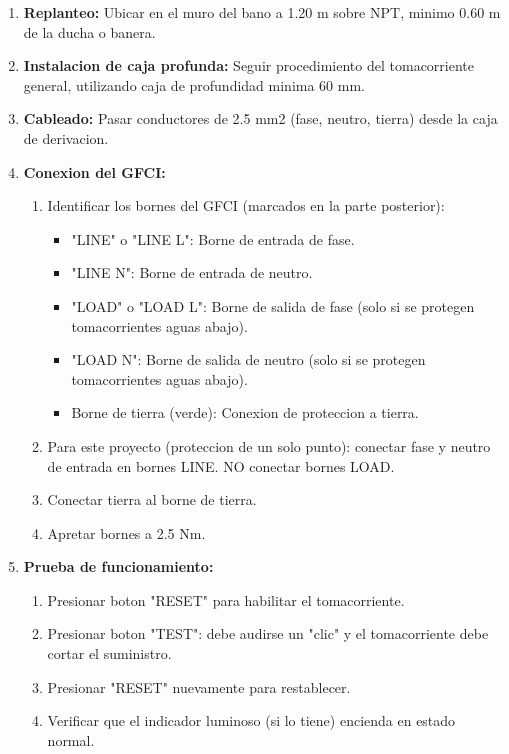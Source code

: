\begin{enumerate}
  \item \textbf{Replanteo:} Ubicar en el muro del bano a 1.20 m sobre NPT, minimo 0.60 m de la ducha o banera.
  \item \textbf{Instalacion de caja profunda:} Seguir procedimiento del tomacorriente general, utilizando caja de profundidad minima 60 mm.
  \item \textbf{Cableado:} Pasar conductores de 2.5 mm2 (fase, neutro, tierra) desde la caja de derivacion.
  \item \textbf{Conexion del GFCI:}
  \begin{enumerate}
    \item Identificar los bornes del GFCI (marcados en la parte posterior):
    \begin{itemize}
      \item "LINE" o "LINE L": Borne de entrada de fase.
      \item "LINE N": Borne de entrada de neutro.
      \item "LOAD" o "LOAD L": Borne de salida de fase (solo si se protegen tomacorrientes aguas abajo).
      \item "LOAD N": Borne de salida de neutro (solo si se protegen tomacorrientes aguas abajo).
      \item Borne de tierra (verde): Conexion de proteccion a tierra.
    \end{itemize}
    \item Para este proyecto (proteccion de un solo punto): conectar fase y neutro de entrada en bornes LINE. NO conectar bornes LOAD.
    \item Conectar tierra al borne de tierra.
    \item Apretar bornes a 2.5 Nm.
  \end{enumerate}
  \item \textbf{Prueba de funcionamiento:}
  \begin{enumerate}
    \item Presionar boton "RESET" para habilitar el tomacorriente.
    \item Presionar boton "TEST": debe audirse un "clic" y el tomacorriente debe cortar el suministro.
    \item Presionar "RESET" nuevamente para restablecer.
    \item Verificar que el indicador luminoso (si lo tiene) encienda en estado normal.
  \end{enumerate}
\end{enumerate}


